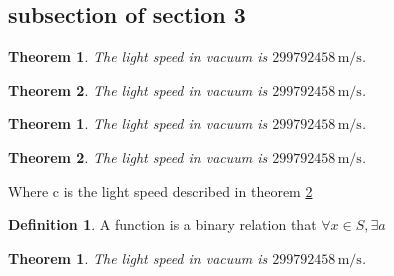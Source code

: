 \documentclass{ctexart}
\begin{document}
\newtheorem{nikname}{Theorem}[subsection]
\newtheorem{Nikname}{Theorem}[section]
\newtheorem*{fikname}{Theorem}
\subsection{subsection of section 3}
\begin{nikname}
	\label{thm:lignt1}
	The light speed in vacuum is $299792458\,\mathrm{m/s}$.
\end{nikname}
\begin{nikname}
	\label{thm:light2}
	The light speed in vacuum is $299792458\,\mathrm{m/s}$.
\end{nikname}
\begin{Nikname}
	\label{thm:lignt3}
	The light speed in vacuum is $299792458\,\mathrm{m/s}$.
\end{Nikname}
\begin{Nikname}
	\label{thm:light4}
	The light speed in vacuum is $299792458\,\mathrm{m/s}$.
\end{Nikname}
Where c is the light speed described in theorem \ref{thm:light4}
\theoremstyle{definition} \newtheorem{Def}{Definition}[section]
\begin{Def}
	A function is a binary relation that $\forall x \in S, \exists a $
\end{Def}
\begin{fikname}
	\label{thm:light5}
	The light speed in vacuum is $299792458\,\mathrm{m/s}$.
\end{fikname}
\end{document}

